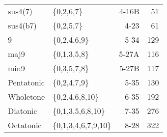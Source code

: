 \documentclass{article}
\begin{document}
\begin{table}[htb]
\begin{center}
\begin{tabular}{llrr}
 sus4(7)     &  \{0,2,6,7\}           &       4-16B  &     51  \\
 sus4(b7)    &  \{0,2,5,7\}           &        4-23  &     61  \\
\hline
 9           &  \{0,2,4,6,9\}         &        5-34  &    129  \\
 maj9        &  \{0,1,3,5,8\}         &       5-27A  &    116  \\
 min9        &  \{0,3,5,7,8\}         &       5-27B  &    117  \\
\hline
 Pentatonic  &  \{0,2,4,7,9\}         &        5-35  &    130  \\
 Wholetone   &  \{0,2,4,6,8,10\}      &        6-35  &    192  \\
 Diatonic    &  \{0,1,3,5,6,8,10\}    &        7-35  &    276  \\
 Octatonic   &  \{0,1,3,4,6,7,9,10\}  &        8-28  &    322  \\
\hline
\end{tabular}
\end{center}
\end{table}
\end{document}

